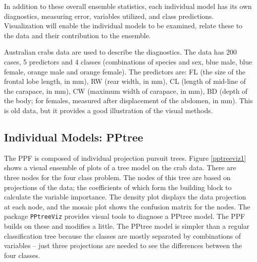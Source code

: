 \documentclass[10pt, legalpaper, twoside]{article}\usepackage[]{graphicx}\usepackage[]{color}
\begin{document}
In addition to these overall ensemble statistics, each individual model has its own diagnostics, measuring error, variables utilized, and class predictions. Visualization will enable the individual models to be examined, relate these to the data and their contribution to the ensemble.

Australian crabs data are used to describe the diagnostics. The data has 200 cases, 5 predictors and 4 classes (combinations of species and sex, blue male, blue female, orange male and orange female). The predictors are: FL (the size of the frontal lobe length, in mm), RW (rear width, in mm), CL (length of mid-line of the carapace, in mm), CW (maximum width of carapace, in mm), BD (depth of the body; for females, measured after displacement of the abdomen, in mm). This is old data, but it provides a good illustration of the visual methods.


\subsection{Individual Models: PPtree}

The PPF is composed of individual projection pursuit trees. Figure \ref{pptreeviz1} shows a visual ensemble of plots of a tree model on the crab data. There are three nodes for the four class problem. The nodes of this tree are based on projections of the data; the coefficients of which form the building block to calculate the variable importance. The density plot displays the data projection at each node, and the mosaic plot shows the confusion matrix for the nodes.
The package \texttt{PPtreeViz} provides visual tools to diagnose a PPtree model. The PPF builds on these and modifies a little. The PPtree model is simpler than a regular classification tree because the classes are mostly separated by combinations of variables -- just three projections are needed to see the differences between the four classes.
\end{document}
